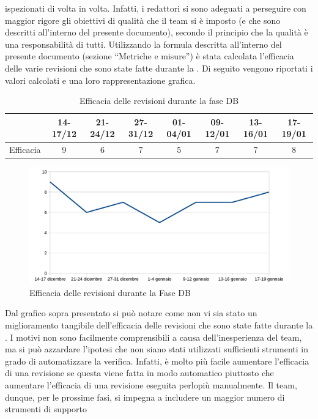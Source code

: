 				ispezionati di volta in volta. Infatti, i redattori si sono adeguati a perseguire con maggior rigore gli obiettivi di qualità che il team 
				si è imposto (e che sono descritti all'interno del presente documento), secondo il principio che la qualità è una responsabilità di tutti.
				Utilizzando la formula descritta all'interno del presente documento (sezione “Metriche e misure”) è stata calcolata l'efficacia delle 
				varie revisioni che sono state fatte durante la . Di seguito vengono riportati i valori calcolati e una loro rappresentazione grafica.
				\begin{table}[H]
					\centering
					\begin{tabu}{| l | c | c | c | c | c | c | c |}
						\hline
							&14-17/12	&21-24/12	&27-31/12 	&01-04/01	&09-12/01	&13-16/01	&17-19/01	\\ \hline
						Efficacia	&9	&6	&7	&5	&7	&7	&8 \\ \hline
					\end{tabu}
					\caption{Efficacia delle revisioni durante la fase DB}
				\end{table}
				\begin{figure}[H]
					\centering
					\includegraphics[width=12cm]{PianoDiQualifica/Pics/EfficaciaRevisioniFaseA.pdf}
					\caption{Efficacia delle revisioni durante la Fase DB}
				\end{figure}
				Dal grafico sopra presentato si può notare come non vi sia stato un miglioramento tangibile dell'efficacia delle revisioni che sono 
				state fatte durante la . I motivi non sono facilmente comprensibili a causa dell'inesperienza del team, ma si può azzardare 
				l'ipotesi che non siano stati utilizzati sufficienti strumenti in grado di automatizzare la verifica. Infatti, è molto più facile 
				aumentare l'efficacia di una revisione se questa viene fatta in modo automatico piuttosto che aumentare l'efficacia di una revisione 
				eseguita perlopiù manualmente. Il team, dunque, per le prossime fasi, si impegna a includere un maggior numero di strumenti di supporto 
